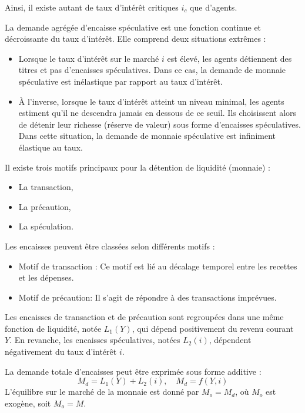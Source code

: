 \documentclass[a4paper, 12pt]{report}
\begin{document}
Ainsi, il existe autant de taux d'intérêt critiques \( i_c \) que d'agents.

La demande agrégée d'encaisse spéculative est une fonction continue et décroissante du taux d'intérêt. Elle comprend deux situations extrêmes :

\begin{itemize}
	\item Lorsque le taux d'intérêt sur le marché \( i \) est élevé, les agents détiennent des titres et pas d'encaisses spéculatives. Dans ce cas, la demande de monnaie spéculative est inélastique par rapport au taux d'intérêt.
	\item À l'inverse, lorsque le taux d'intérêt atteint un niveau minimal, les agents estiment qu'il ne descendra jamais en dessous de ce seuil. Ils choisissent alors de détenir leur richesse (réserve de valeur) sous forme d'encaisses spéculatives. Dans cette situation, la demande de monnaie spéculative est infiniment élastique au taux.
\end{itemize}

Il existe trois motifs principaux pour la détention de liquidité (monnaie) : 
\begin{itemize}
	\item La transaction,
	\item La précaution,
	\item La spéculation.
\end{itemize}

Les encaisses peuvent être classées selon différents motifs :

\begin{itemize}
	\item Motif de transaction : Ce motif est lié au décalage temporel entre les recettes et les dépenses.
	\item Motif de précaution: Il s'agit de répondre à des transactions imprévues.
\end{itemize}

Les encaisses de transaction et de précaution sont regroupées dans une même fonction de liquidité, notée \( L_1(Y) \), qui dépend positivement du revenu courant \( Y \). En revanche, les encaisses spéculatives, notées \( L_2(i) \), dépendent négativement du taux d'intérêt \( i \).

La demande totale d'encaisses peut être exprimée sous forme additive :
\[
M_d = L_1(Y) + L_2(i), \quad M_d = f(Y, i)
\]
L'équilibre sur le marché de la monnaie est donné par \( M_o = M_d \), où \( M_o \) est exogène, soit \( M_o = M \).
\end{document}
